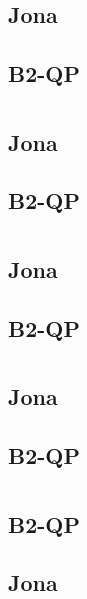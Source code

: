 \documentclass{article}
\begin{document}
\section{}
\subsection*{Jona}


\subsection*{B2-QP}


\section{}
\subsection*{Jona}


\subsection*{B2-QP}


\section{}
\subsection*{Jona}


\subsection*{B2-QP}


\section{}
\subsection*{Jona}


\subsection*{B2-QP}


\section{}
\subsection*{B2-QP}


\subsection*{Jona}

\end{document}
